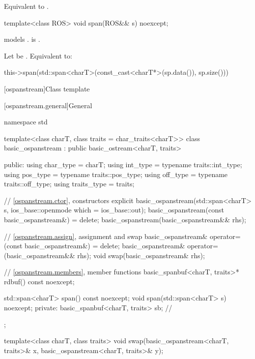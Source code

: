 \begin{itemdescr}
\pnum
\effects
Equivalent to .
\end{itemdescr}

\begin{itemdecl}
template<class ROS> void span(ROS&& s) noexcept;
\end{itemdecl}

\begin{itemdescr}
\pnum
\constraints
{} models .
is .

\pnum
\effects
Let  be .
Equivalent to:
\begin{codeblock}
this->span(std::span<charT>(const_cast<charT*>(sp.data()), sp.size()))
\end{codeblock}
\end{itemdescr}

[ospanstream]{Class template }

[ospanstream.general]{General}

%
\begin{codeblock}
namespace std {
  template<class charT, class traits = char_traits<charT>>
  class basic_ospanstream
    : public basic_ostream<charT, traits> {
  public:
    using char_type   = charT;
    using int_type    = typename traits::int_type;
    using pos_type    = typename traits::pos_type;
    using off_type    = typename traits::off_type;
    using traits_type = traits;

    // \ref{ospanstream.ctor}, constructors
    explicit basic_ospanstream(std::span<charT> s,
                               ios_base::openmode which = ios_base::out);
    basic_ospanstream(const basic_ospanstream&) = delete;
    basic_ospanstream(basic_ospanstream&& rhs);

    // \ref{ospanstream.assign}, assignment and swap
    basic_ospanstream& operator=(const basic_ospanstream&) = delete;
    basic_ospanstream& operator=(basic_ospanstream&& rhs);
    void swap(basic_ospanstream& rhs);

    // \ref{ospanstream.members}, member functions
    basic_spanbuf<charT, traits>* rdbuf() const noexcept;

    std::span<charT> span() const noexcept;
    void span(std::span<charT> s) noexcept;
  private:
    basic_spanbuf<charT, traits> sb;    // \expos
  };

  template<class charT, class traits>
    void swap(basic_ospanstream<charT, traits>& x, basic_ospanstream<charT, traits>& y);
}
\end{codeblock}

